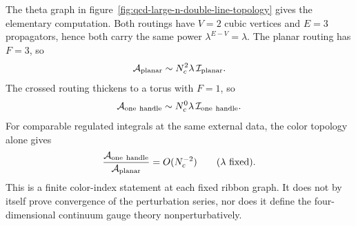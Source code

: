 The theta graph in figure~\ref{fig:qcd-large-n-double-line-topology} gives the
elementary computation.  Both routings have \(V=2\) cubic vertices and
\(E=3\) propagators, hence both carry the same power \(\lambda^{E-V}=\lambda\).
The planar routing has \(F=3\), so
\[
  \mathcal A_{\rm planar}\sim N_c^{2}\lambda\,\mathcal I_{\rm planar}.
\]
The crossed routing thickens to a torus with \(F=1\), so
\[
  \mathcal A_{\rm one\ handle}\sim N_c^{0}\lambda\,
  \mathcal I_{\rm one\ handle}.
\]
For comparable regulated integrals at the same external data, the color
topology alone gives
\begin{equation}
  \frac{\mathcal A_{\rm one\ handle}}{\mathcal A_{\rm planar}}
  =
  O(N_c^{-2})
  \qquad (\lambda \text{ fixed}).
  \label{eq:qcd-large-n-nonplanar-suppression}
\end{equation}
This is a finite color-index statement at each fixed ribbon graph.  It does
not by itself prove convergence of the perturbation series, nor does it define
the four-dimensional continuum gauge theory nonperturbatively.

